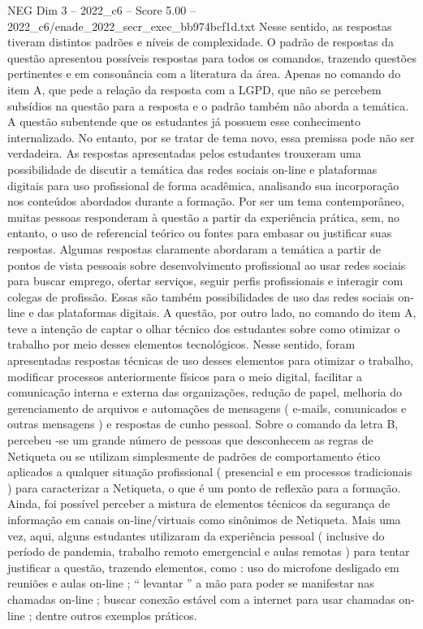 \begin{textsample}{NEG Dim 3 – 2022\_c6 – Score 5.00 – 2022\_c6/enade\_2022\_secr\_exec\_bb974bcf1d.txt}
Nesse sentido, as respostas tiveram distintos padrões e níveis de complexidade.
O padrão de respostas da questão apresentou possíveis respostas para todos os comandos, trazendo questões pertinentes e em consonância com a literatura da área.
Apenas no comando do item A, que pede a relação da resposta com a LGPD, que não se percebem subsídios na questão para a resposta e o padrão também não aborda a temática.
A questão subentende que os estudantes já possuem esse conhecimento internalizado.
No entanto, por se tratar de tema novo, essa premissa pode não ser verdadeira.
As respostas apresentadas pelos estudantes trouxeram uma possibilidade de discutir a temática das redes sociais on-line e plataformas digitais para uso profissional de forma acadêmica, analisando sua incorporação nos conteúdos abordados durante a formação.
Por ser um tema contemporâneo, muitas pessoas responderam à questão a partir da experiência prática, sem, no entanto, o uso de referencial teórico ou fontes para embasar ou justificar suas respostas.
Algumas respostas claramente abordaram a temática a partir de pontos de vista pessoais sobre desenvolvimento profissional ao usar redes sociais para buscar emprego, ofertar serviços, seguir perfis profissionais e interagir com colegas de profissão.
Essas são também possibilidades de uso das redes sociais on-line e das plataformas digitais.
A questão, por outro lado, no comando do item A, teve a intenção de captar o olhar técnico dos estudantes sobre como otimizar o trabalho por meio desses elementos tecnológicos.
Nesse sentido, foram apresentadas respostas técnicas de uso desses elementos para otimizar o trabalho, modificar processos anteriormente físicos para o meio digital, facilitar a comunicação interna e externa das organizações, redução de papel, melhoria do gerenciamento de arquivos e automações de mensagens ( e-mails, comunicados e outras mensagens ) e respostas de cunho pessoal.
Sobre o comando da letra B, percebeu -se um grande número de pessoas que desconhecem as regras de Netiqueta ou se utilizam simplesmente de padrões de comportamento ético aplicados a qualquer situação profissional ( presencial e em processos tradicionais ) para caracterizar a Netiqueta, o que é um ponto de reflexão para a formação.
Ainda, foi possível perceber a mistura de elementos técnicos da segurança de informação em canais on-line/virtuais como sinônimos de Netiqueta.
Mais uma vez, aqui, alguns estudantes utilizaram da experiência pessoal ( inclusive do período de pandemia, trabalho remoto emergencial e aulas remotas ) para tentar justificar a questão, trazendo elementos, como : uso do microfone desligado em reuniões e aulas on-line ; “ levantar ” a mão para poder se manifestar nas chamadas on-line ; buscar conexão estável com a internet para usar chamadas on-line ; dentre outros exemplos práticos.

\end{textsample}
